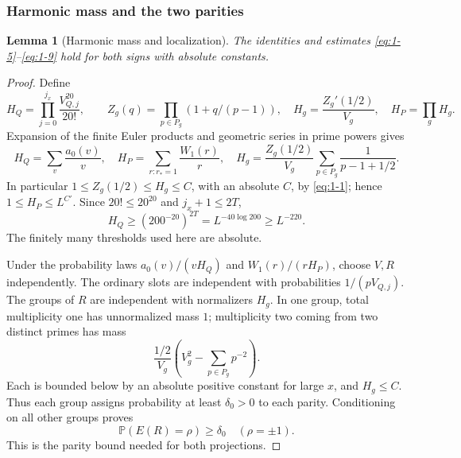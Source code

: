 \documentclass[11pt]{article}
\newtheorem{lemma}[theorem]{Lemma}
\theoremstyle{definition}
\theoremstyle{definition}
\begin{document}
\subsubsection{Harmonic mass and the two parities}\label{sec:mass}
\begin{lemma}[Harmonic mass and localization]\label{lem:mass}
The identities and estimates \eqref{eq:1-5}--\eqref{eq:1-9} hold for both signs with absolute constants.
\end{lemma}
\begin{proof}
Define
\begin{equation*}
H_Q=\prod_{j=0}^{j_x}\frac{V_{Q,j}^{20}}{20!},\qquad
 Z_g(q)=\prod_{p\in P_g}(1+q/(p-1)),\quad
 H_g=\frac{Z_g'(1/2)}{V_g},\quad H_P=\prod_gH_g.
\end{equation*}
Expansion of the finite Euler products and geometric series in prime powers gives
\begin{equation}
H_Q=\sum_v\frac{a_0(v)}v,\quad
 H_P=\sum_{r:r_*=1}\frac{W_1(r)}r,\quad
 H_g=\frac{Z_g(1/2)}{V_g}\sum_{p\in P_g}\frac1{p-1+1/2}.
                                                        \tag{1.5}\label{eq:1-5}
\end{equation}
In particular \(1\le Z_g(1/2)\le H_g\le C\), with an absolute \(C\), by \eqref{eq:1-1}; hence \(1\le H_P\le L^{C'}\). Since \(20!\le20^{20}\) and \(j_x+1\le2T\),
\begin{equation}
H_Q\ge(200^{-20})^{2T}=L^{-40\log200}\ge L^{-220}.         \tag{1.6}\label{eq:1-6}
\end{equation}
The finitely many thresholds used here are absolute.

Under the probability laws \(a_0(v)/(vH_Q)\) and \(W_1(r)/(rH_P)\), choose \(V,R\) independently. The ordinary slots are independent with probabilities \(1/(pV_{Q,j})\). The groups of \(R\) are independent with normalizers \(H_g\). In one group, total multiplicity one has unnormalized mass \(1\); multiplicity two coming from two distinct primes has mass
\begin{equation*}
\frac{1/2}{V_g}\left(V_g^2-\sum_{p\in P_g}p^{-2}\right).
\end{equation*}
Each is bounded below by an absolute positive constant for large \(x\), and \(H_g\le C\). Thus each group assigns probability at least \(\delta_0>0\) to each parity. Conditioning on all other groups proves
\begin{equation}
\mathbb P(E(R)=\rho)\ge\delta_0\quad(\rho=\pm1).           \tag{1.7}\label{eq:1-7}
\end{equation}
This is the parity bound needed for both projections.


\end{proof}
\end{document}
